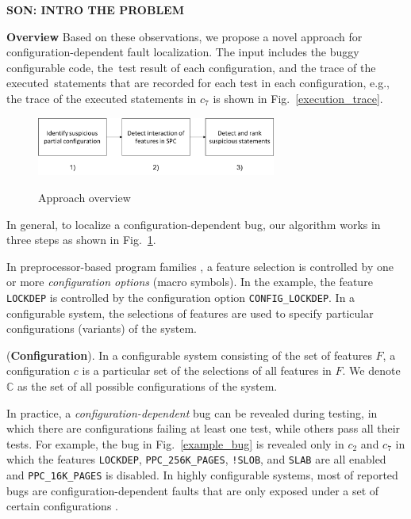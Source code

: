 \textbf{SON: INTRO THE PROBLEM}

\textbf{Overview}
Based on these observations, we propose a novel approach for
configuration-dependent fault localization. The input includes 
the buggy configurable code, the~test result of each
configuration, and the trace of the executed~statements that are
recorded for each test in each configuration, e.g., the trace of the
executed statements in $c_7$ is shown in Fig.~\ref{execution_trace}.

\begin{figure}[h]
\centering
\includegraphics[width=0.7\textwidth]{flowchart}
\label{workflow}
\caption{Approach overview}
\end{figure}
%
In general, to localize a configuration-dependent bug, our algorithm
works in three steps as shown in Fig.~\ref{workflow}.

%
In preprocessor-based program families \cite{kastner2012virtual}, a 
feature selection is controlled by one or more \textit{configuration 
options} (macro symbols). In the example, the feature \texttt{LOCKDEP} 
is controlled by the configuration option \texttt{CONFIG\_LOCKDEP}.
%
In a configurable system, the selections of features are used to specify
particular configurations (variants) of the system.
%
\begin{Definition}{({\bf Configuration}).}
In a configurable system consisting of the set of features $F$, a 
configuration $c$ is a particular set of the selections of all 
features in $F$. We denote $\mathbb{C}$ as the set of all possible 
configurations of the system.
\end{Definition}

In practice, a {\em configuration-dependent} bug can be revealed
during testing, in which there are configurations failing at least
one test, while others pass all their tests.
%
For example, the bug in Fig.~\ref{example_bug} is revealed only in
$c_2$ and $c_7$ in which the features \texttt{LOCKDEP},
\texttt{PPC\_256K\_PAGES}, \texttt{!SLOB}, and \texttt{SLAB} are all
enabled and \texttt{PPC\_16K\_PAGES} is disabled.
%
In highly configurable systems, most of reported bugs  are 
configuration-dependent faults that are only exposed under a set of 
certain configurations \cite{Abal:2018} \cite{Garvin:2011}. 

